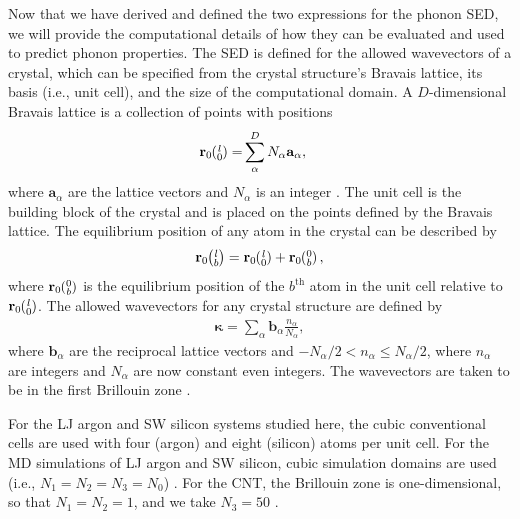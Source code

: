 \documentclass[12pt,twocolumn,iop]{/usr/share/texmf-texlive/tex/latex/iop/iopart}[/usr/share/texmf-texlive/tex/latex/iop/]
\newcommand{\ab}[2]{\mspace{-4.0mu}\left(\mspace{-8.0mu}\begin{smallmatrix}&\ifthenelse{\equal{#1}{}}{a}{#1} \\&\ifthenelse{\equal{#2}{}}{b}{#2}\end{smallmatrix}\mspace{-3.0mu}\right)}
\begin{document}
Now that we have derived and defined the two expressions for the phonon SED, we will provide the computational details of how they can be evaluated and used to predict phonon properties. The SED is defined for the allowed wavevectors of a crystal, which can be specified from the crystal structure's Bravais lattice, its basis (i.e., unit cell), and the size of the computational domain. A $D$-dimensional Bravais lattice is a collection of points with
positions
\begin{equation}\label{crys_pos}
\begin{split}
\mathbf{r}_0\ab{l}{0} =& \sum^D_{\alpha} N_{\alpha}\mathbf{a}_{\alpha},
\end{split}
\end{equation}
where $\mathbf{a}_{\alpha}$ are the lattice vectors and $N_{\alpha}$ is an integer \cite{dove1993}. The unit cell is the building block of the crystal and is placed on the points defined by the Bravais lattice. The equilibrium position of any atom in the crystal can be described by
\begin{equation}\label{crys_pos2}
\begin{split}
\mathbf{r}_0\ab{l}{b} = \mathbf{r}_0\ab{l}{0} + \mathbf{r}_0\ab{0}{b},
\end{split}
\end{equation}
where $\mathbf{r}_0\ab{0}{b}$ is the equilibrium position of the $b^{\textrm{th}}$ atom in the unit cell relative to $\mathbf{r}_0\ab{l}{0}$. The allowed wavevectors for any crystal structure are defined by
\begin{equation}\label{crys_pos3}
\begin{split}
\pmb{\kappa} = \sum_{\alpha} \mathbf{b}_{\alpha} \frac{n_{\alpha}}{N_{\alpha}},
\end{split}
\end{equation}
where $\mathbf{b}_{\alpha}$ are the reciprocal lattice vectors and $-N_{\alpha}/2 < n_{\alpha} \leq N_{\alpha}/2$, where $n_{\alpha}$ are integers and $N_{\alpha}$ are now constant even integers. The wavevectors are taken to be in the first Brillouin zone \cite{ashcroft1976}.

For the LJ argon and SW silicon systems studied here, the cubic conventional cells are used with four (argon) and eight (silicon) atoms per unit cell. For the MD simulations of LJ argon and SW silicon, cubic simulation domains are used (i.e., $N_1 = N_2 = N_3 = N_0$) \cite{mcgaughey2004c,turney2009a,sellan2010a}. For the CNT, the Brillouin zone is one-dimensional, so that $N_1 = N_2 = 1$, and we take $N_3=50$ \cite{thomas2010c}.
\end{document}

